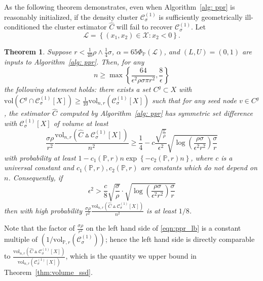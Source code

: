 \documentclass[11pt,twoside]{article}
\newtheorem{theorem}{Theorem}
\newcommand{\set}[1]{\left\{#1\right\}}
\newcommand{\vol}{\mathrm{vol}}
\newcommand{\1}{\mathbf{1}}
\newcommand{\Xbf}{X}             %
\newcommand{\Pbb}{\mathbb{P}}
\newcommand{\Cset}{\mathcal{C}}
\newcommand{\Csig}{\Cset_{\sigma}}
\begin{document}
As the following theorem demonstrates, even when Algorithm~\ref{alg: ppr} is reasonably initialized, if the density cluster $\mathcal{C}_{\sigma}^{(1)}$ is sufficiently geometrically ill-conditioned the cluster estimator $\widehat{C}$ will fail to recover $\mathcal{C}_{\sigma}^{(1)}$. Let
\begin{equation}
\label{eqn:lower_set}
\mathcal{L} = \set{(x_1,x_2) \in \mathcal{X}: x_2 < 0}.
\end{equation}
\begin{theorem}
	\label{thm:ppr_lb}
	Suppose $r < \frac{1}{40}\rho \wedge \frac{1}{4}\sigma$,  $\alpha = 65 \Phi_{\Pbb}(\mathcal{L})$, and $(L,U) = (0,1)$ are inputs to Algorithm~\ref{alg: ppr}. Then, for any
	\begin{equation}
	\label{eqn:lb_sample_size}
	n \geq \max\set{\frac{64}{\epsilon^2 \rho \sigma \pi r^2}, \frac{8}{\epsilon}}
	\end{equation}
	the following statement holds: there exists a set $C^{g} \subset \Xbf$ with $\vol(C^g \cap \mathcal{C}_{\sigma}^{(1)}[\Xbf]) \geq \frac{1}{10}\vol_{n,r}(\mathcal{C}_{\sigma}^{(1)}[\Xbf])$ such that for any seed node $v \in C^g$, the estimator $\widehat{C}$ computed by Algorithm~\ref{alg: ppr} has symmetric set difference with $\Csig^{(1)}[\Xbf]$ of volume at least
	\begin{equation}
	\label{eqn:ppr_lb}
	\frac{\sigma \rho}{r^2}\frac{\vol_{n,r}(\widehat{C} \vartriangle \mathcal{C}_{\sigma}^{(1)}[\Xbf])}{n^2} \geq \frac{1}{4} -  c \frac{\sqrt{\frac{\sigma}{\rho}}}{\epsilon^2} \sqrt{ \log\left(\frac{\rho \sigma}{\epsilon^2 r^2}\right)\frac{\sigma}{r}}
	\end{equation}
	with probability at least $1 - c_1(\Pbb,r) n \exp\set{-c_2(\Pbb,r)n}$, where $c$ is a universal constant and $c_1(\Pbb,r),c_2(\Pbb,r)$ are constants which do not depend on $n$.
	Consequently, if
	\begin{equation*} 
	\epsilon^2 > \frac{c}{8} \sqrt{\frac{\sigma}{\rho}} \cdot \sqrt{ \log\left(\frac{\rho \sigma}{\epsilon^2 r^2}\right)\frac{\sigma}{r}}
	\end{equation*}
	then with high probability $\frac{\sigma \rho}{r^2}\frac{\vol_{n,r}(\widehat{C} \vartriangle \mathcal{C}_{\sigma}^{(1)}[\Xbf])}{n^2}$ is at least $1/8$. 
\end{theorem}

Note that the factor of $\frac{\sigma\rho}{r^2}$ on the left hand side of \eqref{eqn:ppr_lb} is a constant multiple of $(1/\vol_{\Pbb,r}(\Csig^{(1)}))$; hence the left hand side is directly comparable to $\frac{\vol_{n,r}(\widehat{C} \vartriangle \mathcal{C}_{\sigma}^{(1)}[\Xbf])}{\vol_{n,r}(\Csig^{(1)}[\Xbf])}$, which is the quantity we upper bound in Theorem~\ref{thm:volume_ssd}.
\end{document}
